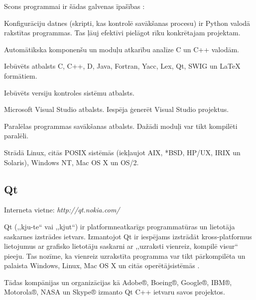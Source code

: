 Scons programmai ir šādas galvenas īpašības \cite{SCons}:
\begin{dotlist}
	\item Konfigurāciju datnes (skripti, kas kontrolē savākšanas procesu) ir
		Python valodā rakstītas programmas. Tas ļāuj efektīvi pielāgot rīku konkrētajam
		projektam.
	\item Automātikska komponenšu un moduļu atkarību analīze C un C++ valodām.
	\item Iebūvēts atbalsts C, C++, D, Java, Fortran, Yacc, Lex, Qt, SWIG un \LaTeX
		formātiem.
	\item Iebūvēts versiju kontroles sistēmu atbalsts.
	\item Microsoft Visual Studio atbalsts. Iespēja ģenerēt Visual Studio projektus.
	\item Paralēlas programmas savākšanas atbalsts. Dažādi moduļi var tikt kompilēti
		paralēli.
	\item Strādā Linux, citās POSIX sistēmās (iekļaujot AIX, *BSD, HP/UX, IRIX un
		Solaris), Windows NT, Mac OS X un OS/2.
\end{dotlist}

\subsection{Qt}
Interneta vietne: \emph{http://qt.nokia.com/}

Qt (,,kju-te`` vai ,,kjut``) ir platformneatkarīgs programmatūras un lietotāja
saskarnes izstrādes ietvars. Izmantojot Qt ir iespējams izstrādāt kross-platformus
lietojumus ar grafisko lietotāju saskarni ar ,,uzraksti vienreiz, kompilē visur``
pieeju. Tas nozīme, ka vienreiz uzrakstīta programma var tikt pārkompilēta un palaista
Windows, Linux, Mac OS X un citās operētājsistēmās \cite{QtNokia}.

Tādas kompānijas un organizācijas kā Adobe®, Boeing®, Google®, IBM®, Motorola®,
NASA un Skype® izmanto Qt C++ ietvaru savos projektos.

